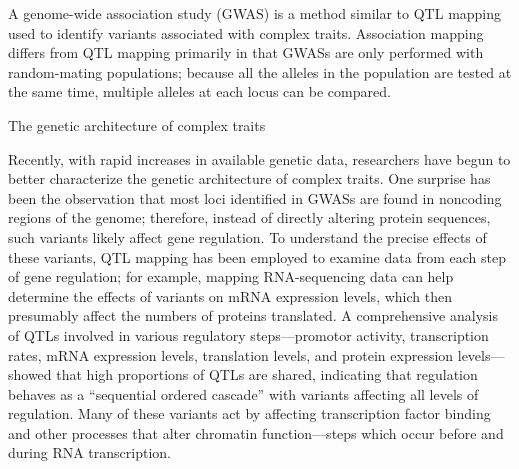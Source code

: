 A genome-wide association study (GWAS) is a method similar to QTL mapping used to identify variants associated with complex traits. Association mapping differs from QTL mapping primarily in that GWASs are only performed with random-mating populations; because all the alleles in the population are tested at the same time, multiple alleles at each locus can be compared.

The genetic architecture of complex traits

Recently, with rapid increases in available genetic data, researchers have begun to better characterize the genetic architecture of complex traits. One surprise has been the observation that most loci identified in GWASs are found in noncoding regions of the genome; therefore, instead of directly altering protein sequences, such variants likely affect gene regulation. To understand the precise effects of these variants, QTL mapping has been employed to examine data from each step of gene regulation; for example, mapping RNA-sequencing data can help determine the effects of variants on mRNA expression levels, which then presumably affect the numbers of proteins translated. A comprehensive analysis of QTLs involved in various regulatory steps---promotor activity, transcription rates, mRNA expression levels, translation levels, and protein expression levels---showed that high proportions of QTLs are shared, indicating that regulation behaves as a ``sequential ordered cascade'' with variants affecting all levels of regulation. Many of these variants act by affecting transcription factor binding and other processes that alter chromatin function---steps which occur before and during RNA transcription.

